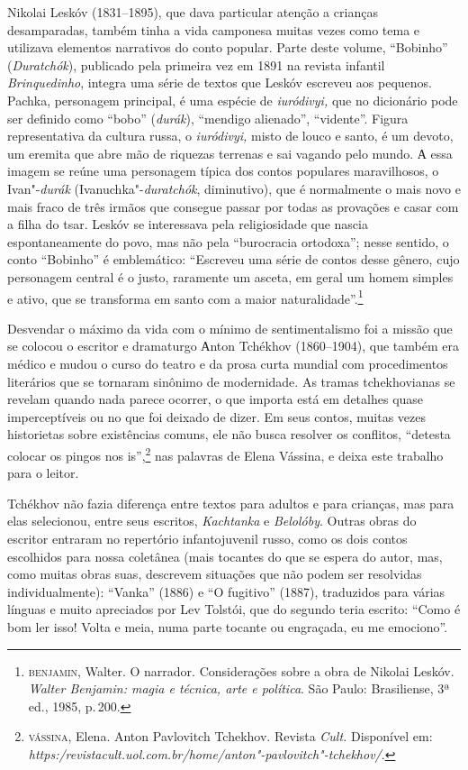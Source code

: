 Nikolai Leskóv (1831--1895), que dava particular atenção a crianças desamparadas,
também tinha a vida camponesa muitas vezes como tema e utilizava
elementos narrativos do conto popular. Parte deste volume, ``Bobinho''
(\emph{Duratchók}), publicado pela primeira vez em 1891 na revista
infantil \emph{Brinquedinho}, integra uma série de textos que
Leskóv escreveu aos pequenos. Pachka, personagem principal, é uma
espécie de \emph{iuródivyi,} que no dicionário pode ser definido como
``bobo'' (\emph{durák}), ``mendigo alienado'', ``vidente''. Figura
representativa da cultura russa, o \emph{iuródivyi,} misto de louco e
santo, é um devoto, um eremita que abre mão de riquezas terrenas e sai
vagando pelo mundo. А essa imagem se reúne uma personagem típica dos
contos populares maravilhosos, o Ivan"-\emph{durák}
(Ivanuchka"-\emph{duratchók}, diminutivo), que é normalmente o mais novo e mais fraco
de três irmãos que consegue passar por todas as provações e casar com a
filha do tsar. Leskóv se interessava pela religiosidade que nascia
espontaneamente do povo, mas não pela ``burocracia ortodoxa''; nesse
sentido, o conto ``Bobinho'' é emblemático: ``Escreveu uma série de
contos desse gênero, cujo personagem central é o justo, raramente um
asceta, em geral um homem simples e ativo, que se transforma em santo
com a maior naturalidade''.\footnote{\textsc{benjamin}, Walter. O narrador.
  Considerações sobre a obra de Nikolai Leskóv. \emph{Walter Benjamin:
  magia e técnica, arte e política}. São Paulo: Brasiliense, 3ª ed.,
  1985, p.\,200.}

Desvendar o máximo da vida com o mínimo de sentimentalismo foi a missão
que se colocou o escritor e dramaturgo Аnton Tchékhov (1860--1904), que
também era médico e mudou o curso do teatro e da prosa curta mundial com
procedimentos literários que se tornaram sinônimo de modernidade. As
tramas tchekhovianas se revelam quando nada parece ocorrer, o que
importa está em detalhes quase imperceptíveis ou no que foi deixado de
dizer. Em seus contos, muitas vezes historietas sobre existências
comuns, ele não busca resolver os conflitos, ``detesta colocar os pingos
nos is'',\footnote{\textsc{vássina}, Elena. Anton Pavlovitch Tchekhov. Revista
  \emph{Cult.} Disponível em:
  \emph{https:/revistacult.uol.com.br/home/anton"-pavlovitch"-tchekhov/}.}
nas palavras de Elena Vássina, e deixa este trabalho para o leitor.

Tchékhov não fazia diferença entre textos para adultos e para crianças,
mas para elas selecionou, entre seus escritos, \emph{Kachtanka} e
\emph{Belolóby}. Outras obras do escritor entraram no repertório
infantojuvenil russo, como os dois contos escolhidos para nossa
coletânea (mais tocantes do que se espera do autor, mas, como muitas
obras suas, descrevem situações que não podem ser resolvidas
individualmente): ``Vanka'' (1886) e ``O fugitivo''
(1887), traduzidos para várias línguas e muito apreciados por Lev
Tolstói, que do segundo teria escrito: ``Como é bom ler isso! Volta e
meia, numa parte tocante ou engraçada, eu me emociono''.

